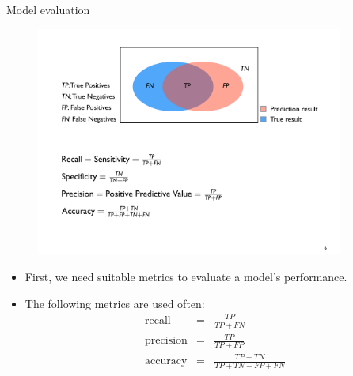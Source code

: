 \documentclass[xcolor=pdftex,dvipsnames,table]{beamer}
\begin{document}
\begin{frame}{Model evaluation}
	\begin{figure}[htb]
		\includegraphics[width=0.9\textwidth]{../graphics/ModelEvaluation.pdf}
	\end{figure}
	\begin{itemize}
		\item First, we need suitable metrics to evaluate a model's performance.
		\item The following metrics are used often:
		\begin{eqnarray*}
		\text{recall} &=& \frac{TP}{TP + FN} \\
		\text{precision} &=& \frac{TP}{TP + FP} \\
		\text{accuracy} &=& \frac{TP + TN}{TP + TN + FP + FN} \\
		\end{eqnarray*}
	\end{itemize}
\end{frame}
\end{document}
